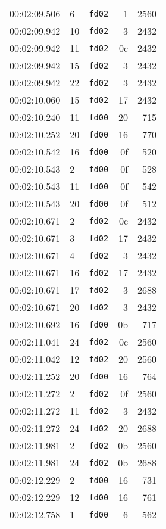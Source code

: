 \documentclass{article}
\begin{document}
\begin{longtable}{lllrr}
00:02:09.506 & 6 & \texttt{fd02} & 1 & 2560 \\
00:02:09.942 & 10 & \texttt{fd02} & 3 & 2432 \\
00:02:09.942 & 11 & \texttt{fd02} & 0c & 2432 \\
00:02:09.942 & 15 & \texttt{fd02} & 3 & 2432 \\
00:02:09.942 & 22 & \texttt{fd02} & 3 & 2432 \\
00:02:10.060 & 15 & \texttt{fd02} & 17 & 2432 \\
00:02:10.240 & 11 & \texttt{fd00} & 20 & 715 \\
00:02:10.252 & 20 & \texttt{fd00} & 16 & 770 \\
00:02:10.542 & 16 & \texttt{fd00} & 0f & 520 \\
00:02:10.543 & 2 & \texttt{fd00} & 0f & 528 \\
00:02:10.543 & 11 & \texttt{fd00} & 0f & 542 \\
00:02:10.543 & 20 & \texttt{fd00} & 0f & 512 \\
00:02:10.671 & 2 & \texttt{fd02} & 0c & 2432 \\
00:02:10.671 & 3 & \texttt{fd02} & 17 & 2432 \\
00:02:10.671 & 4 & \texttt{fd02} & 3 & 2432 \\
00:02:10.671 & 16 & \texttt{fd02} & 17 & 2432 \\
00:02:10.671 & 17 & \texttt{fd02} & 3 & 2688 \\
00:02:10.671 & 20 & \texttt{fd02} & 3 & 2432 \\
00:02:10.692 & 16 & \texttt{fd00} & 0b & 717 \\
00:02:11.041 & 24 & \texttt{fd02} & 0c & 2560 \\
00:02:11.042 & 12 & \texttt{fd02} & 20 & 2560 \\
00:02:11.252 & 20 & \texttt{fd00} & 16 & 764 \\
00:02:11.272 & 2 & \texttt{fd02} & 0f & 2560 \\
00:02:11.272 & 11 & \texttt{fd02} & 3 & 2432 \\
00:02:11.272 & 24 & \texttt{fd02} & 20 & 2688 \\
00:02:11.981 & 2 & \texttt{fd02} & 0b & 2560 \\
00:02:11.981 & 24 & \texttt{fd02} & 0b & 2688 \\
00:02:12.229 & 2 & \texttt{fd00} & 16 & 731 \\
00:02:12.229 & 12 & \texttt{fd00} & 16 & 761 \\
00:02:12.758 & 1 & \texttt{fd00} & 6 & 562 \\

\end{longtable}
\end{document}
